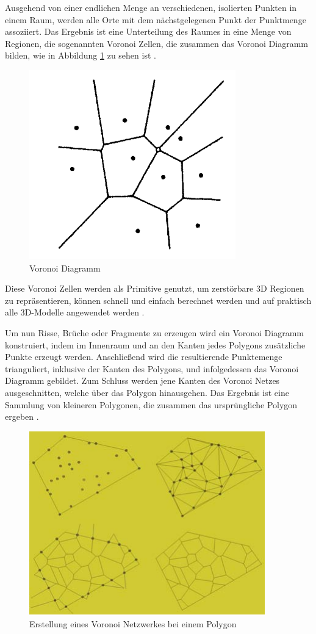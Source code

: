 Ausgehend von einer endlichen Menge an verschiedenen, isolierten Punkten in einem Raum, werden alle Orte mit dem nächstgelegenen Punkt der Punktmenge assoziiert.
Das Ergebnis ist eine Unterteilung des Raumes in eine Menge von Regionen, die sogenannten Voronoi Zellen, die zusammen das Voronoi Diagramm bilden, 
wie in Abbildung \ref{fig:voronoi1} zu sehen ist \cite{Okabe.SpatialTessellationsVoronoi}.


\begin{figure}[H]
    \centering
    \includegraphics[width=0.35\linewidth]{PICs/basicVoronoi.PNG}
    \caption{Voronoi Diagramm \protect\cite{Okabe.SpatialTessellationsVoronoi}}
    \label{fig:voronoi1}
\end{figure}

Diese Voronoi Zellen werden als Primitive genutzt, um zerstörbare 3D Regionen zu repräsentieren, können schnell und einfach berechnet werden und auf praktisch alle 3D-Modelle
angewendet werden \cite{Najim.DynamicFracturing}.

Um nun Risse, Brüche oder Fragmente zu erzeugen wird ein Voronoi Diagramm konstruiert, indem im Innenraum und an den Kanten jedes Polygons zusätzliche Punkte erzeugt werden. 
Anschließend wird die resultierende Punktemenge trianguliert, inklusive der Kanten des Polygons, und infolgedessen das Voronoi Diagramm gebildet. 
Zum Schluss werden jene Kanten des Voronoi Netzes ausgeschnitten, welche über das Polygon hinausgehen. Das Ergebnis ist eine Sammlung von kleineren Polygonen, die zusammen
das ursprüngliche Polygon ergeben \cite{Raghavachary.FractureGenerationOnPolygonalMeshes}.

\begin{figure}[H]
    \centering
    \includegraphics[width=0.5\linewidth]{PICs/voronoiSteps.PNG}
    \caption{Erstellung eines Voronoi Netzwerkes bei einem Polygon \protect\cite{Raghavachary.FractureGenerationOnPolygonalMeshes}}
    \label{fig:voronoi2}
\end{figure}

